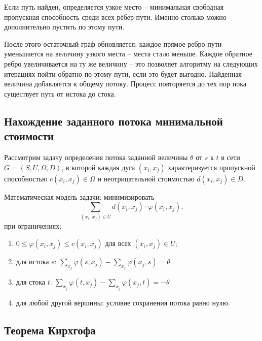 Если путь найден, определяется узкое место -- минимальная свободная
пропускная способность среди всех рёбер пути.
Именно столько можно дополнительно пустить по этому пути.

После этого остаточный граф обновляется: каждое прямое ребро пути
уменьшается на величину узкого места -- места стало меньше.
Каждое обратное ребро увеличивается на ту же величину -- это позволяет
алгоритму на следующих итерациях пойти обратно по этому пути, если это будет выгодно.
Найденная величина добавляется к общему потоку.
Процесс повторяется до тех пор пока существует путь от истока до стока.

\subsection{Нахождение заданного потока минимальной стоимости}

Рассмотрим задачу определения потока заданной величины $\theta$ от $s$ к
$t$ в сети $G = (S, U, \Omega, D)$, в которой каждая дуга $(x_i, x_j)$
характеризуется пропускной способностью $c(x_i, x_j) \in \Omega$ и
неотрицательной стоимостью $d(x_i, x_j) \in D$.

Математическая модель задачи: минимизировать
\[
    \sum_{(x_i,\, x_j) \in U} d(x_i, x_j) \cdot \varphi(x_i, x_j),
\]
при ограничениях:

\begin{enumerate}
    \item $0 \leqslant \varphi(x_i, x_j) \leqslant c(x_i, x_j)$
          для всех $(x_i, x_j) \in U$;
    \item для истока $s$:
          $\displaystyle\sum_{x_j} \varphi(s, x_j) - \sum_{x_j} \varphi(x_j, s) = \theta$
    \item для стока $t$:
          $\displaystyle\sum_{x_j} \varphi(t, x_j) - \sum_{x_j} \varphi(x_j, t) = -\theta$
    \item для любой другой вершины: условие сохранения потока равно нулю.
\end{enumerate}

\subsection{Теорема Кирхгофа}

